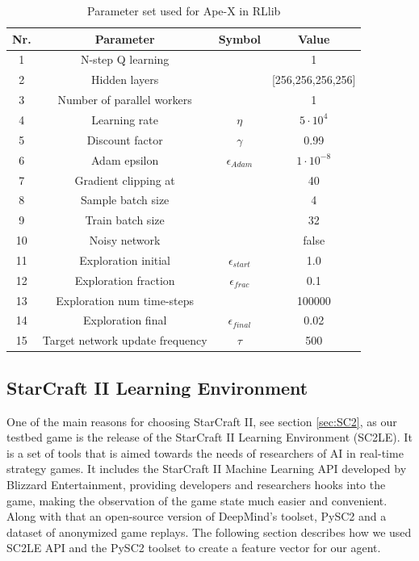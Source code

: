 \documentclass[12pt,a4paper]{article}
\begin{document}
\begin{table}
    \begin{center}
        \begin{tabular}{| c | c | c | c |}
            \hline
            Nr. & {\bf Parameter} & {\bf Symbol} & {\bf Value} \\
            \hline
            \hline
            1 & N-step Q learning &  & 1 \\
            \hline
            2 & Hidden layers &  & [256,256,256,256] \\
            \hline
            3 & Number of parallel workers &  & 1 \\
            \hline
            \hline
            4 & Learning rate & $\eta$ & $5 \cdot 10^4$ \\
            \hline
            5 & Discount factor & $\gamma$ & 0.99 \\
            \hline
            6 &Adam epsilon & $\epsilon_{Adam}$ & $1 \cdot 10^{-8}$ \\
            \hline
            7 & Gradient clipping at &  & 40 \\
            \hline
            8 & Sample batch size & & 4 \\
            \hline
            9 & Train batch size &  & 32 \\
            \hline
            10 & Noisy network &  & false \\
            \hline
            \hline
            11 & Exploration initial & $\epsilon_{start}$ & 1.0 \\
            \hline
            12 & Exploration fraction & $\epsilon_{frac}$ & 0.1 \\
            \hline
            13 & Exploration num time-steps &  & 100000 \\
            \hline
            14 & Exploration final & $\epsilon_{final}$ & 0.02 \\
            \hline
            15 & Target network update frequency & $\tau$ & 500 \\
            \hline
        \end{tabular}
        \caption{Parameter set used for Ape-X in RLlib}
        \label{tab:apex_params}
    \end{center}
\end{table} 
\subsection{StarCraft II Learning Environment}
One of the main reasons for choosing StarCraft II, see section \ref{sec:SC2}, as our testbed game is the release of the StarCraft II Learning Environment (SC2LE). It is a set of tools that is aimed towards the needs of researchers of AI in real-time strategy games. It includes the StarCraft II Machine Learning API developed by Blizzard Entertainment, providing developers and researchers hooks into the game, making the observation of the game state much easier and convenient. Along with that an open-source version of DeepMind's toolset, PySC2 and a dataset of anonymized game replays. The following section describes how we used SC2LE API and the PySC2 toolset to create a feature vector for our agent.
\label{sec:SC2API}
\end{document}
